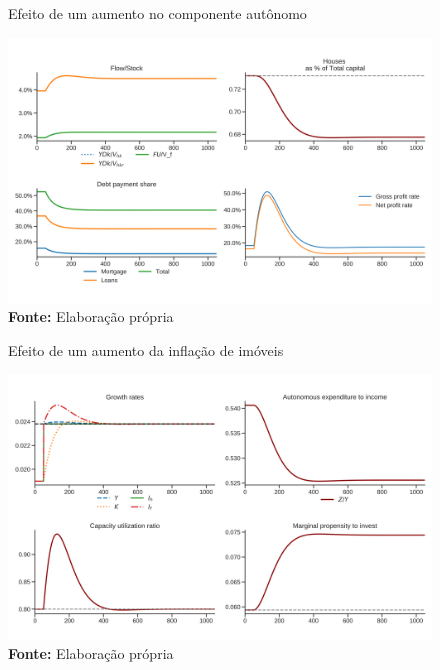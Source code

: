 \begin{figure}[H]
	\centering
	\caption{Efeito de um aumento no componente autônomo}
	\label{choque_1Norms}
	\includegraphics[width=\textwidth]{../../Modelo/Versoes/Shock_1Norms.png}
	\caption*{\textbf{Fonte:} Elaboração própria}
\end{figure}


\begin{figure}[H]
	\centering
	\caption{Efeito de um aumento da inflação de imóveis}
	\label{choque_4}
	\includegraphics[width=\textwidth]{../../Modelo/Versoes/Shock_4.png}
	\caption*{\textbf{Fonte:} Elaboração própria}
\end{figure}


